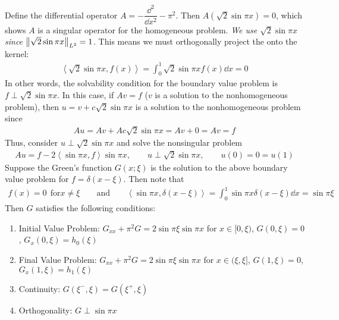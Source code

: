 \documentclass{article} %
\theoremstyle{plain}
\newcommand{\VEC}[2]{\left\langle #1, #2 \right\rangle}
\begin{document}
Define the differential operator $A = -\dfrac{\dd^2}{\dd x^2} - \pi^2$.  Then $A(\sqrt{2}\sin \pi x) = 0$, which shows $A$ is a singular operator for the homogeneous problem.  \emph{We use $\sqrt{2}\sin \pi x$ since $\norm{\sqrt{2}\sin\pi x}_{L^2} = 1$.}  This means we must orthogonally project the onto the kernel:
\begin{align*}
    \VEC{\sqrt{2}\sin\pi x}{f(x)} = \int_0^1 \sqrt{2}\sin\pi x f(x) \dd x = 0
\end{align*}
In other words, the solvability condition for the boundary value problem is $f \perp \sqrt{2}\sin \pi x$.  In this case, if $Av = f$ ($v$ is a solution to the nonhomogeneous problem), then $u = v + c\sqrt{2}\sin\pi x$ is a solution to the nonhomogeneous problem since
\begin{align*}
    Au = Av + Ac\sqrt{2}\sin \pi x = Av + 0 = Av = f
\end{align*}
Thus, consider $u \perp \sqrt{2}\sin \pi x$ and solve the nonsingular problem
\begin{align}
    \label{projected_problem}
    Au = f - 2\VEC{\sin\pi x}{f}\sin\pi x, \qquad u \perp \sqrt{2}\sin\pi x, \qquad u(0) = 0 = u(1)
\end{align}
Suppose the Green's function $G(x;\xi)$ is the solution to the above boundary value problem for $f = \delta(x - \xi)$.  Then note that
\begin{align*}
    f(x) = 0\ \ \text{for} x \neq \xi \qquad \text{and} \qquad \VEC{\sin\pi x}{\delta(x-\xi)} = \int_0^1 \sin \pi x \delta(x - \xi)\dd x = \sin \pi \xi
\end{align*}
Then $G$ satisfies the following conditions:
\begin{enumerate}
    \item Initial Value Problem: $G_{xx} + \pi^2 G = 2\sin\pi\xi\sin\pi x$ for $x \in [0,\xi)$, $G(0,\xi) = 0$, $G_x(0, \xi) = h_0(\xi)$
    \item Final Value Problem: $G_{xx} + \pi^2 G = 2\sin\pi\xi\sin\pi x$ for $x \in (\xi,\xi]$, $G(1,\xi) = 0$, $G_x(1, \xi) = h_1(\xi)$
    \item Continuity: $G(\xi^-, \xi) = G(\xi^+, \xi)$
    \item Orthogonality: $G \perp \sin \pi x$
\end{enumerate}
\end{document}
